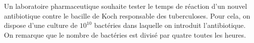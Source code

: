 
Un laboratoire pharmaceutique souhaite tester le temps de réaction d'un nouvel antibiotique contre le bacille de Koch responsable des tuberculoses. Pour cela, on dispose d'une culture de $10^{10}$ bactéries dans laquelle on introduit l'antibiotique. On remarque que le nombre de bactéries est divisé par quatre toutes les heures.
